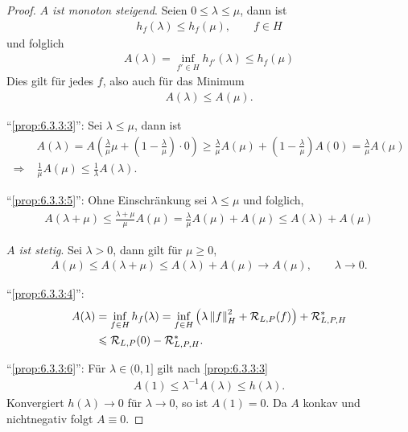 \begin{proof}
\textit{$A$ ist monoton steigend}. Seien $0\le \lambda\le \mu$, dann ist
\begin{align*}
h_f(\lambda) \le h_f(\mu),\qquad f\in H
\end{align*}
und folglich
\begin{align*}
A(\lambda) = \inf_{f'\in H} h_{f'}(\lambda) \le h_f(\mu)
\end{align*}
Dies gilt für jedes $f$, also auch für das Minimum
\begin{align*}
A(\lambda)\le A(\mu).
\end{align*}

"`\ref{prop:6.3.3:3}"': Sei $\lambda\le \mu$, dann ist
\begin{align*}
&A(\lambda) = A\left(\frac{\lambda}{\mu}\mu +
\left(1-\frac{\lambda}{\mu}\right)\cdot 0 \right)
\ge
\frac{\lambda}{\mu}A(\mu) + \left(1-\frac{\lambda}{\mu}\right)A(0)
= \frac{\lambda}{\mu}A(\mu)\\
\Rightarrow\;
&\frac{1}{\mu}A(\mu) \le \frac{1}{\lambda}A(\lambda).
\end{align*}

"`\ref{prop:6.3.3:5}"': Ohne Einschränkung sei $\lambda\le \mu$ und folglich,
\begin{align*}
A(\lambda + \mu) \le \frac{\lambda+\mu}{\mu}A(\mu)
=\frac{\lambda}{\mu}A(\mu) + A(\mu)
\le A(\lambda) + A(\mu)
\end{align*}

\textit{$A$ ist stetig}. Sei $\lambda > 0$, dann gilt für $\mu\ge 0$,
\begin{align*}
A(\mu) \le A(\lambda + \mu) \le A(\lambda) + A(\mu) \to A(\mu),\qquad
\lambda \to 0.
\end{align*}

"`\ref{prop:6.3.3:4}"': 
\begin{align*}
A(\lambda) &
= \inf_{f\in H} h_f(\lambda)
= \inf_{f\in H} \left(\lambda\left\|f\right\|_H^2 + \mathcal{R}_{L,P}(f) \right) +
\mathcal{R}_{L,P,H}^*\\
& \leqslant \mathcal{R}_{L,P}(0) - \mathcal{R}_{L,P,H}^*.
\end{align*}

"`\ref{prop:6.3.3:6}"': 
Für $\lambda\in (0,1]$ gilt nach \ref{prop:6.3.3:3}
\begin{align*}
A(1) \le \lambda^{-1}A(\lambda) \le h(\lambda).
\end{align*}
Konvergiert $h(\lambda)\to 0$ für $\lambda\to 0$, so ist
$A(1) = 0$. Da $A$ konkav und nichtnegativ folgt $A\equiv 0$.\qedhere
\end{proof}

